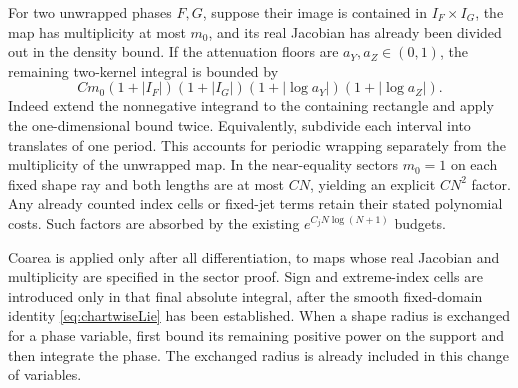 \documentclass[11pt]{article}
\numberwithin{equation}{section}
\theoremstyle{definition}
\begin{document}
For two unwrapped phases \(F,G\), suppose their image is contained
in \(I_F\times I_G\), the map has multiplicity at most \(m_0\),
and its real Jacobian has already been divided out in the density
bound. If the attenuation floors are \(a_Y,a_Z\in(0,1)\), the
remaining two-kernel integral is bounded by
\[
 C m_0(1+|I_F|)(1+|I_G|)
       (1+|\log a_Y|)(1+|\log a_Z|).
\]
Indeed extend the nonnegative integrand to the containing rectangle
and apply the one-dimensional bound twice. Equivalently, subdivide
each interval into translates of one period. This accounts for
periodic wrapping separately from the multiplicity of the unwrapped
map. In the near-equality sectors \(m_0=1\) on each fixed shape
ray and both lengths are at most \(CN\), yielding an explicit
\(CN^2\) factor. Any already counted index cells or fixed-jet
terms retain their stated polynomial costs. Such factors are
absorbed by the existing \(e^{C_jN\log(N+1)}\) budgets.

Coarea is applied only after all differentiation, to maps whose
real Jacobian and multiplicity are specified in the sector proof.
Sign and extreme-index cells are introduced only in that final
absolute integral, after the smooth fixed-domain identity
\eqref{eq:chartwiseLie} has been established. When a shape radius
is exchanged for a phase variable, first bound its remaining positive
power on the support and then integrate the phase. The exchanged
radius is already included in this change of variables.
\end{document}
